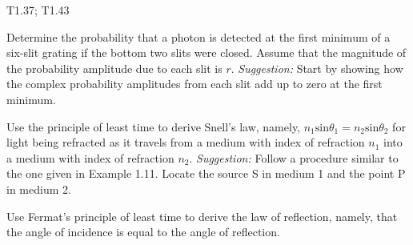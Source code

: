 \documentclass[11pt,letterpaper,boxed, noheader]{pset}
\begin{document}
    \begin{center}
        T1.37; T1.43
    \end{center}
    
    \begin{problem} [T1.37]
        Determine the probability that a photon is detected at the first minimum of a six-slit grating if the bottom two slits were closed. Assume that the magnitude of the probability amplitude due to each slit is $r$. \textit{Suggestion:} Start by showing how the complex probability amplitudes from each slit add up to zero at the first minimum.
    \end{problem}
    \newpage
    
    \begin{problem} [T1.43]
        Use the principle of least time to derive Snell's law, namely, $n_1 \text{sin} \theta_1 = n_2 \text{sin} \theta_2$ for light being refracted as it travels from a medium with index of refraction $n_1$ into a medium with index of refraction $n_2$. \textit{Suggestion:} Follow a procedure similar to the one given in Example 1.11. Locate the source S in medium 1 and the point P in medium 2.
    \end{problem}
    \newpage
    
    \begin{problem} [Example 1.11]
        Use Fermat's principle of least time to derive the law of reflection, namely, that the angle of incidence is equal to the angle of reflection. 
    \end{problem}
    
\end{document}
